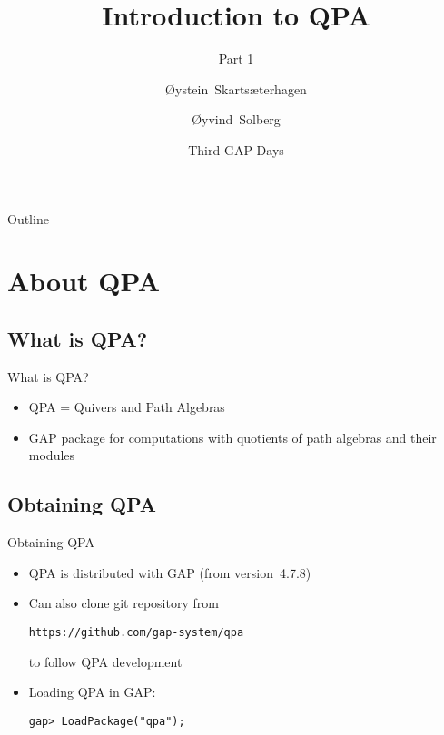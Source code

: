 \documentclass[usenames,dvipsnames]{beamer}
\title[Introduction to QPA, part 1] %
{Introduction to QPA}
\subtitle
{Part 1} %
\author%
{\O{}ystein~Skarts\ae{}terhagen \and \O{}yvind~Solberg}
\institute%
{
Department of Mathematical Sciences\\
Norwegian University of Science and Technology
}
\date%
{Third GAP Days}
\begin{document}
\begin{frame}
  \titlepage
\end{frame}

\begin{frame}{Outline}
  \tableofcontents
\end{frame}




\section{About QPA}

\subsection{What is QPA?}

\begin{frame}{What is QPA?}
\begin{itemize}
\item QPA = Quivers and Path Algebras
\item GAP package for computations with quotients of path algebras
and their modules
\end{itemize}
\end{frame}

\subsection{Obtaining QPA}

\begin{frame}[fragile]{Obtaining QPA}
\begin{itemize}
\item QPA is distributed with GAP (from version~4.7.8)
\item Can also clone git repository from
\begin{center}\texttt{https://github.com/gap-system/qpa}\end{center}
to follow QPA development
\item Loading QPA in GAP:
\begin{verbatim}
gap> LoadPackage("qpa");
\end{verbatim}
\end{itemize}
\end{frame}
\end{document}
